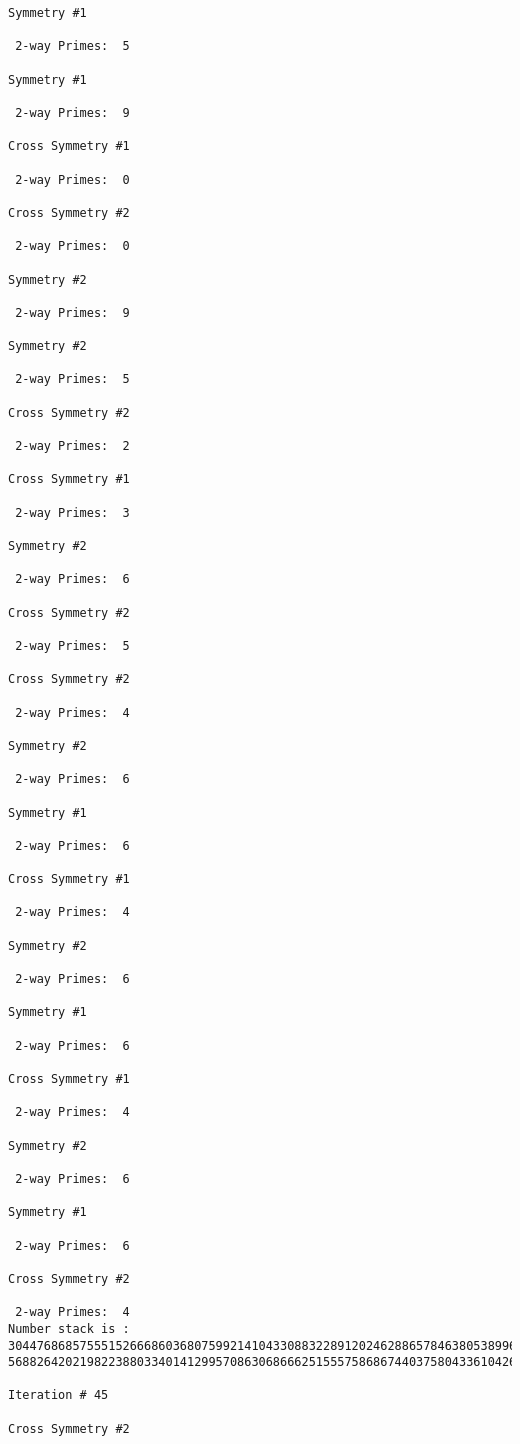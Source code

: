 \begin{verbatim}
Symmetry #1

 2-way Primes: 	5

Symmetry #1

 2-way Primes: 	9

Cross Symmetry #1

 2-way Primes: 	0

Cross Symmetry #2

 2-way Primes: 	0

Symmetry #2

 2-way Primes: 	9

Symmetry #2

 2-way Primes: 	5

Cross Symmetry #2

 2-way Primes: 	2

Cross Symmetry #1

 2-way Primes: 	3

Symmetry #2

 2-way Primes: 	6

Cross Symmetry #2

 2-way Primes: 	5

Cross Symmetry #2

 2-way Primes: 	4

Symmetry #2

 2-way Primes: 	6

Symmetry #1

 2-way Primes: 	6

Cross Symmetry #1

 2-way Primes: 	4

Symmetry #2

 2-way Primes: 	6

Symmetry #1

 2-way Primes: 	6

Cross Symmetry #1

 2-way Primes: 	4

Symmetry #2

 2-way Primes: 	6

Symmetry #1

 2-way Primes: 	6

Cross Symmetry #2

 2-way Primes: 	4
Number stack is :
30447686857555152666860368075992141043308832289120246288657846380538996794608835958544046240163340857
56882642021982238803340141299570863068666251555758686744037580433610426404458595388064976998350836487

Iteration #	45

Cross Symmetry #2


\end{verbatim}
